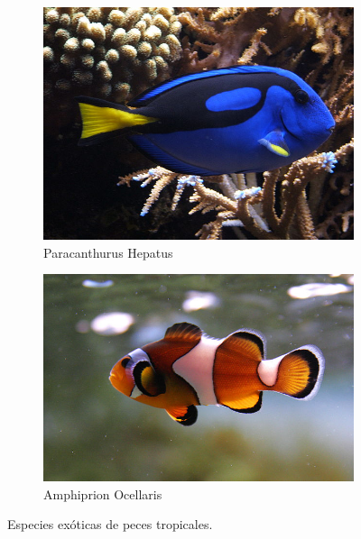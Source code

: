 \begin{figure}[h]
\centering
\begin{subfigure}{.5\textwidth}
  \centering
  \includegraphics[height=.15\textheight]{./Figures/Dory.jpg}
  \caption[Paracanthurus Hepatus]{Paracanthurus Hepatus\protect\footnotemark}
  \label{fig:sub1}
\end{subfigure}%
\begin{subfigure}{.5\textwidth}
  \centering
  \includegraphics[height=.15\textheight]{./Figures/Nemo.jpg}
  	\caption[Amphiprion Ocellaris]{Amphiprion Ocellaris\protect\footnotemark}
  \label{fig:sub2}
\end{subfigure}
\caption{Especies exóticas de peces tropicales.}
\label{fig:peces}
\end{figure}

